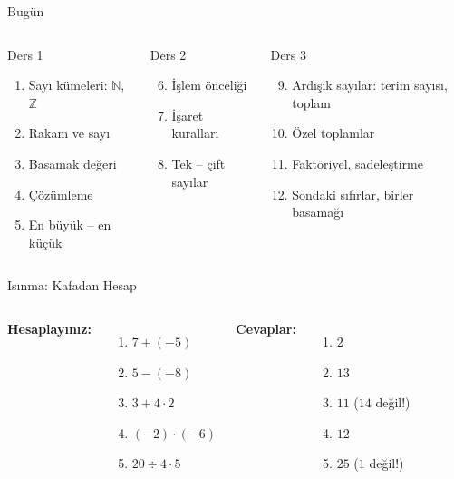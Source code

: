 \documentclass[aspectratio=169,11pt,handout]{beamer}
\begin{document}
\begin{frame}{Bugün}
\begin{columns}[t]
\begin{block}{Ders 1}
\begin{enumerate}
\item Sayı kümeleri: \(\mathbb{N}\), \(\mathbb{Z}\)
\item Rakam ve sayı
\item Basamak değeri
\item Çözümleme
\item En büyük -- en küçük
\end{enumerate}
\end{block}
\begin{block}{Ders 2}
\begin{enumerate}\setcounter{enumi}{5}
\item İşlem önceliği
\item İşaret kuralları
\item Tek -- çift sayılar
\end{enumerate}
\end{block}
\begin{block}{Ders 3}
\begin{enumerate}\setcounter{enumi}{8}
\item Ardışık sayılar: terim sayısı, toplam
\item Özel toplamlar
\item Faktöriyel, sadeleştirme
\item Sondaki sıfırlar, birler basamağı
\end{enumerate}
\end{block}
\end{columns}
\end{frame}

\begin{frame}{Isınma: Kafadan Hesap}
\begin{columns}[t]
\textbf{Hesaplayınız:}
\begin{enumerate}
\item \(7+(-5)\)
\item \(5-(-8)\)
\item \(3+4\cdot 2\)
\item \((-2)\cdot(-6)\)
\item \(20\div 4\cdot 5\)
\end{enumerate}
\pause
\textbf{Cevaplar:}
\begin{enumerate}
\item \(2\)
\item \(13\)
\item \(11\) \quad(\(14\) değil!)
\item \(12\)
\item \(25\) \quad(\(1\) değil!)
\end{enumerate}
\end{columns}
\end{frame}
\end{document}
